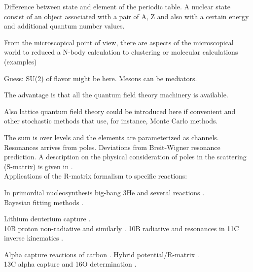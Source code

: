 \documentclass[openany]{book}
\begin{document}
Difference between state and element of the periodic table. A nuclear state consist of an object associated with a pair of A, Z and also  with a certain energy and additional quantum number values.

From the microscopical point of view, there are aspects of the microscopical world to reduced a N-body calculation to  clustering or molecular calculations (examples)

Guess: SU(2) of flavor might be here. Mesons can be mediators. 

The advantage is that all the quantum field theory machinery is available.

Also lattice quantum field theory could be introduced here if convenient and other stochastic methods that use, for instance, Monte Carlo methods. 

The sum is over levels and the elements are parameterized as channels.  \\

Resonances arrives from poles. Deviations from Breit-Wigner resonance prediction. A description on the physical consideration of poles in the scattering (S-matrix) is given in \cite{ramirezjimenez_kelkar_2018}. \\

Applications of the R-matrix formalism to specific reactions:

In primordial nucleosynthesis \cite{desouza_iliadis_coc_2019} big-bang 3He and several reactions \cite{sparta_pizzone_bertulani_hou_lamia_tumino_2020}. \\

Bayesian fitting methods \cite{odell_brune_phillips_2022}.

Lithium deuterium capture \cite{grineviciute_lamia_mukhamedzhanov_spitaleri_lacognata_2015}. \\

10B proton non-radiative \cite{kolk_macon_deboer_anderson_boeltzig_brandenburg_brune_chen_clark_danley_et_2022} and similarly \cite{sieverding_randhawa_zetterberg_deboer_ahn_mancino_martinez-pinedo_hix_2022}. 10B radiative and resonances in 11C inverse kinematics \cite{kaur_guimaraes_zamora_assuncao_alcantara-nunez_delara_zevallos_ribeiro_lichtenthaler_pires_et_2022}.

Alpha capture reactions of carbon \cite{schurmann_gialanella_kunz_strieder_2012}.  Hybrid potential/R-matrix \cite{sparenberg_2005}. \\ 13C alpha capture and 16O determination \cite{prusachenko_bobrovsky_bondarenko_bokhovko_gurbich_ketlerov_2022}.
\end{document}
